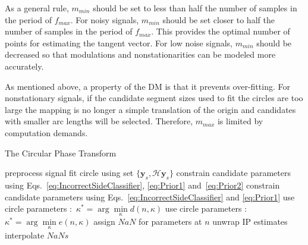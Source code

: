\documentclass[journal,11pt,a4paper,onecolumn,draftcls]{IEEEtran}
\begin{document}
As a general rule, $m_{min}$ should be set to less than half the number of samples in the period of $f_{max}$. For noisy signals, $m_{min}$ should be set closer to half the number of samples in the period of $f_{max}$. This provides the optimal number of points for estimating the tangent vector. For low noise signals, $m_{min}$ should be decreased so that modulations and nonstationarities can be modeled more accurately. 

As mentioned above, a property of the DM is that it prevents over-fitting. For nonstationary signals, if the candidate segment sizes used to fit the circles are too large the mapping is no longer a simple translation of the origin and candidates with smaller arc lengths will be selected. Therefore, $m_{max}$ is limited by computation demands.

\begin{algorithm}
\caption{The Circular Phase Transform}\label{CPTAlgorithm}
\begin{algorithmic}[1]
\State preprocess signal
        \State fit circle using set $\{\mathbf{y}_s,\mathcal{H}\mathbf{y}_s\}$
    \EndFor
            \State constrain candidate parameters using Eqs.~\ref{eq:IncorrectSideClassifier}, \ref{eq:Prior1} and~\ref{eq:Prior2}
        \Else
            \State constrain candidate parameters using Eqs.~\ref{eq:IncorrectSideClassifier} and \ref{eq:Prior1}
        \EndIf
            \State use circle parameters $:$ ${\kappa^ * } = \arg \mathop {\min }\limits_\kappa d\left( n,\kappa \right)$
        \Else
            \State use circle parameters $:$ ${\kappa^ * } = \arg \mathop {\min }\limits_\kappa e\left( n,\kappa \right)$
        \EndIf
    \Else
        \State assign $NaN$ for parameters at $n$
    \EndIf
\EndFor
\State unwrap IP estimates
\State interpolate $NaNs$
\end{algorithmic}
\end{algorithm}
\end{document}
